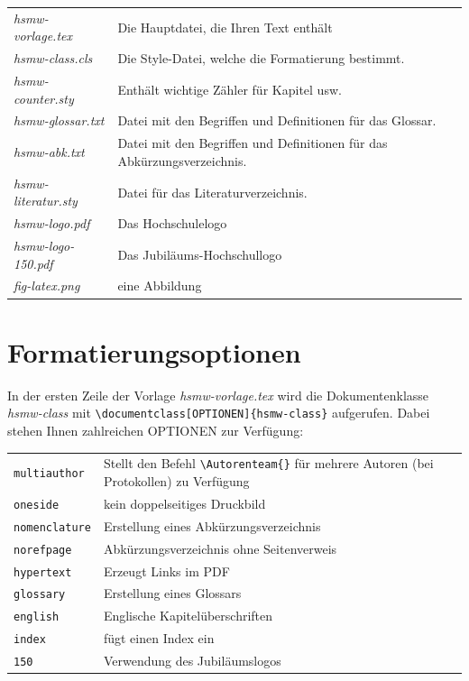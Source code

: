 \documentclass[nomenclature, norefpage, oneside, glossary, hypertext,multiauthor]{hsmw-class}
\begin{document}
\begin{tabular}{lp{}}
\textit{hsmw-vorlage.tex} & Die Hauptdatei, die Ihren Text enthält \\
\textit{hsmw-class.cls} & Die Style-Datei, welche die Formatierung bestimmt.\\
\textit{hsmw-counter.sty} & Enthält wichtige Zähler für Kapitel usw.\\
\textit{hsmw-glossar.txt} & Datei mit den Begriffen und Definitionen für das Glossar.\\
\textit{hsmw-abk.txt} & Datei mit den Begriffen und Definitionen für das Abkürzungsverzeichnis.\\
\textit{hsmw-literatur.sty} & Datei für das Literaturverzeichnis.\\
\textit{hsmw-logo.pdf} & Das Hochschulelogo\\
\textit{hsmw-logo-150.pdf} & Das Jubiläums-Hochschullogo\\
\textit{fig-latex.png} & eine Abbildung\\
\end{tabular}

\section{Formatierungsoptionen}
In der ersten Zeile der Vorlage \textit{hsmw-vorlage.tex} wird die Dokumentenklasse \textit{hsmw-class}  mit \verb+\documentclass[OPTIONEN]{hsmw-class}+ aufgerufen. Dabei stehen Ihnen zahlreichen OPTIONEN zur Verfügung:

\begin{tabular}{lp{}}
\texttt{multiauthor} & Stellt den Befehl \verb+\Autorenteam{}+ für mehrere Autoren (bei Protokollen) zu Verfügung \\
\texttt{oneside} & kein doppelseitiges Druckbild \\
\texttt{nomenclature} & Erstellung eines Abkürzungsverzeichnis \\
\texttt{norefpage} & Abkürzungsverzeichnis ohne Seitenverweis \\
\texttt{hypertext} & Erzeugt Links im PDF \\
\texttt{glossary} & Erstellung eines Glossars \\
\texttt{english} & Englische Kapitelüberschriften \\
\texttt{index} & fügt einen Index ein \\
\texttt{150} & Verwendung des Jubiläumslogos \\
\end{tabular}
\end{document}
